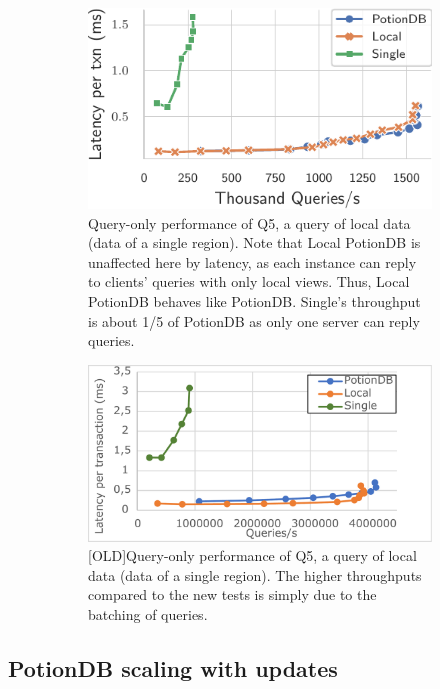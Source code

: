 \documentclass[sigplan,10pt]{acmart}
\begin{document}
\begin{figure}[h]
\centering
	\begin{subfigure}{.47\linewidth}
		\includegraphics[width=1\linewidth]{singleQuery/q5_latency}
		\caption{Query-only performance of Q5, a query of local data (data of a single region). Note that Local PotionDB is unaffected here by latency, as each instance can reply to clients' queries with only local views. Thus, Local PotionDB behaves like PotionDB. Single's throughput is about 1/5 of PotionDB as only one server can reply queries.}
		\label{fig:(new)q5_tc}
	\end{subfigure}%
	\hspace*{3em}
	\begin{subfigure}{.47\linewidth}
		\includegraphics[width=1\linewidth]{Q5_tc}
		\caption{[OLD]Query-only performance of Q5, a query of local data (data of a single region). The higher throughputs compared to the new tests is simply due to the batching of queries.}
		\label{fig:(old)q5_tc}
	\end{subfigure}
\caption{}
\end{figure}

\subsection{PotionDB scaling with updates}
\end{document}
